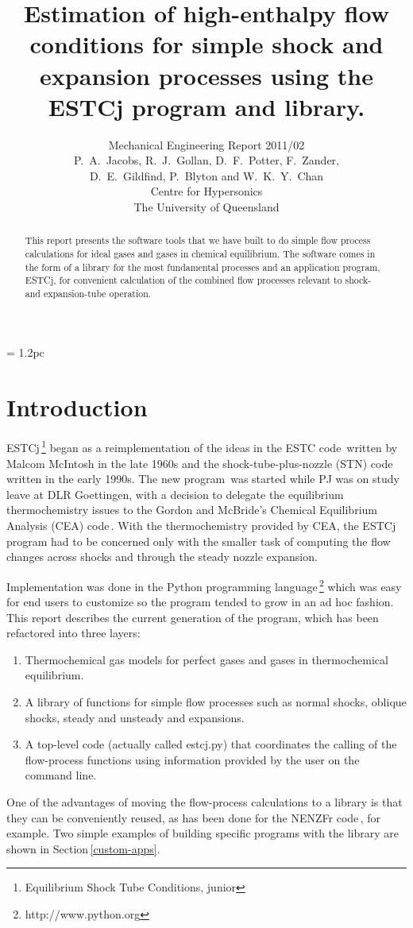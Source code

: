 \documentclass[10pt,a4paper]{article}
\title{
  Estimation of high-enthalpy flow conditions
  for simple shock and expansion processes using
  the ESTCj program and library.
}
\author{
  Mechanical Engineering Report 2011/02 \\
  P.~A.~Jacobs, R.~J.~Gollan, D.~F.~Potter, F.~Zander,\\
  D.~E.~Gildfind, P.~Blyton and W.~K.~Y.~Chan \\
  Centre for Hypersonics\\
  The University of Queensland
}
\begin{document}
\maketitle

\baselineskip = 1.2pc

\begin{abstract}
This report presents the software tools that we have built to do simple
flow process calculations for ideal gases and gases in chemical equilibrium.
The software comes in the form of a library for the most fundamental processes and
an application program, ESTCj, for convenient calculation of 
the combined flow processes relevant to shock- and expansion-tube operation.
\end{abstract}

\bigskip
\tableofcontents


\newpage
\section{Introduction}
%
ESTCj\,\footnote{Equilibrium Shock Tube Conditions, junior} 
began as a reimplementation of the ideas in the ESTC code\,\cite{mcintosh_70}
written by Malcom McIntosh in the late 1960s and 
the shock-tube-plus-nozzle (STN) code\,\cite{krek_jacobs_93} written in the early 1990s.
The new program\,\cite{jacobs_gardner_2003a} was started 
while PJ was on study leave at DLR Goettingen,
with a decision to delegate the equilibrium thermochemistry issues to the 
Gordon and McBride's Chemical Equilibrium Analysis (CEA) 
code\,\cite{gordon_mcbride_1994,mcbride_gordon_1996}.
With the thermochemistry provided by CEA, the ESTCj program had to be concerned
only with the smaller task of computing the flow changes across shocks and through
the steady nozzle expansion.

\medskip
Implementation was done in the Python programming language\,\footnote{http://www.python.org}
which was easy for end users to customize so the program tended to grow in an ad hoc fashion.
This report describes the current generation of the program, which has been refactored into
three layers:
\begin{enumerate}
 \item Thermochemical gas models for perfect gases and gases in thermochemical equilibrium.
 \item A library of functions for simple flow processes such as normal shocks, oblique shocks,
  steady and unsteady and expansions.
 \item A top-level code (actually called estcj.py) that coordinates the calling 
  of the flow-process functions using information provided by the user on the command line.
\end{enumerate}
One of the advantages of moving the flow-process calculations to a library is that 
they can be conveniently reused, 
as has been done for the NENZFr code\,\cite{doherty_etal_2012a}, for example.
Two simple examples of building specific programs with the library are shown in
Section\,\ref{custom-apps}.
\end{document}
